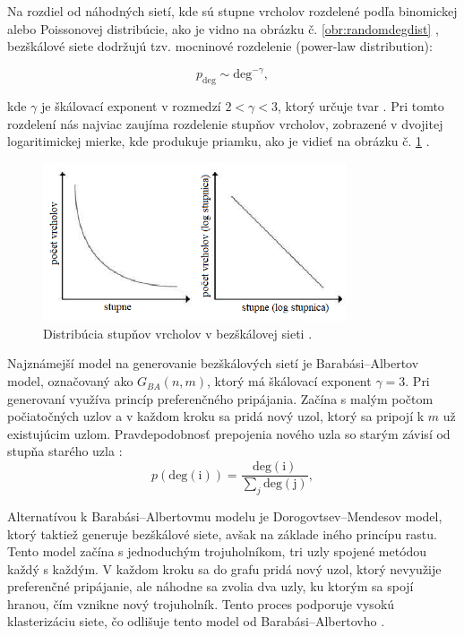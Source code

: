 Na rozdiel od náhodných sietí, kde sú stupne vrcholov rozdelené podľa binomickej alebo Poissonovej distribúcie, ako je vidno na obrázku č. \ref{obr:randomdegdist} ,
bezškálové siete dodržujú tzv. mocninové rozdelenie (power-law distribution):

\begin{equation}
    p_{\mathrm{deg}} \sim \mathrm{deg}^{-\gamma},
    \label{eq:power_law_distribution_scale_free}
\end{equation}

kde $\gamma$ je škálovací exponent v rozmedzí $2 < \gamma < 3$, ktorý určuje tvar \cite{barabasi2016network} . Pri tomto rozdelení nás najviac zaujíma
rozdelenie stupňov vrcholov, zobrazené v dvojitej logaritimickej mierke, kde produkuje priamku, ako je vidieť na obrázku č. \ref{obr:powerlaw} .

\begin{figure}
    \centerline{\includegraphics[width=0.8\textwidth]{images/powerlaw.png}}
    \caption[Distribúcia stupňov vrcholov v bezškálovej sieti.]{Distribúcia stupňov vrcholov v bezškálovej sieti \cite{inproceedings} .}
    \label{obr:powerlaw}
\end{figure}

Najznámejší model na generovanie bezškálových sietí je Barabási–Albertov model, označovaný ako $G_{BA}(n, m)$, ktorý má
škálovací exponent $\gamma = 3$. Pri generovaní využíva princíp preferenčného pripájania. Začína s malým počtom počiatočných uzlov a v každom kroku sa pridá nový uzol,
ktorý sa pripojí k $m$ už existujúcim uzlom. Pravdepodobnosť prepojenia nového uzla so starým závisí od stupňa starého uzla \cite{barabasi2016network} :
\begin{equation}
    p(\mathrm{deg(i)}) = \frac{\mathrm{deg(i)}}{\sum_j \mathrm{deg(j)}},
    \label{eq:preferential_attachment}
\end{equation}

Alternatívou k Barabási–Albertovmu modelu je Dorogovtsev–Mendesov model, ktorý taktiež generuje bezškálové siete, avšak na základe iného princípu rastu.
Tento model začína s jednoduchým trojuholníkom, tri uzly spojené metódou každý s každým. V každom kroku sa do grafu pridá nový uzol, ktorý nevyužije preferenčné
pripájanie, ale náhodne sa zvolia dva uzly, ku ktorým sa spojí hranou, čím vznikne nový trojuholník. Tento proces podporuje vysokú klasterizáciu siete,
čo odlišuje tento model od Barabási–Albertovho \cite{dorogovtsev2002evolution} . 


